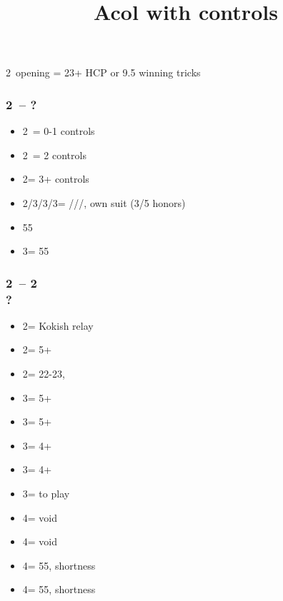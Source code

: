 \documentclass[12pt, a4paper]{article}
\title{Acol with controls}
\author{}
\begin{document}
\maketitle


2\clubs\ opening = 23+ HCP or 9.5 winning tricks

\subsubsection*{2\clubs\ -- ?}
\begin{itemize}
    \item 2\diams\ = 0-1 controls
    \item 2\hearts\ = 2 controls
    \item 2\spades = 3+ controls
    \item 2\nt/3\clubs/3\diams/3\hearts = \clubs/\diams/\hearts/\spades, own suit (3/5 honors)
    \item 55\minor
    \item 3\nt = 55\major
\end{itemize}

\subsubsection*{2\clubs\ -- 2\diams\\?}
\begin{itemize}
    \item 2\hearts = Kokish relay
    \item 2\spades = 5+\spades
    \item 2\nt = 22-23, \bal
    \item 3\clubs = 5+\clubs
    \item 3\diams = 5+\diams
    \item 3\hearts = 4+\diams
    \item 3\spades = 4+\diams
    \item 3\nt = to play
    \item 4\clubs = \hearts void
    \item 4\diams = \spades void
    \item 4\hearts = 55\minor, \hearts shortness
    \item 4\spades = 55\minor, \spades shortness
\end{itemize}
\end{document}
